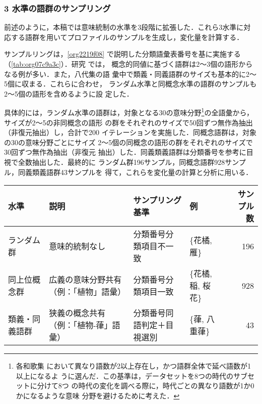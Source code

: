 \documentclass[submit]{ipsj}
\renewcommand{\ref}{\cref}
\begin{document}
\subsubsection{3 水準の語群のサンプリング\label{orgd9e4052}}
\label{sec:orgfc1bab2}
前述のように，本稿では意味統制の水準を3段階に拡張した．これら3水準に対
応する語群を用いてプロファイルのサンプルを生成し，変化量を計算する．

サンプルリングは，\ref{org2219f08} で説明した分類語彙表番号を基に実施する
（\ref{tab:org07c9a3c}）．研究 \cite{Speelman2003Profilebased} では，
概念的同値に基づく語群は2～3個の語形からなる例が多い．また，八代集の語
彙中で類義・同義語群のサイズも基本的に2～5個に収まる．これらに合わせ，
ランダム水準と同概念水準の語群のサンプルも2～5個の語形を含めるように設
定した．

具体的には，ランダム水準の語群は，対象となる30の意味分野\footnote{各和歌集
において異なり語数が2以上存在し，かつ語群全体で延べ語数が1以上になるよ
うに選んだ．この基準は，データセットを8つの時代のサブセットに分けて8つ
の時代の変化を調べる際に，時代ごとの異なり語数が1か0かになるような意味
分野を避けるために考えた．}の全語彙から，サイズが2～5の非同概念の語形
の群をそれぞれのサイズで50回ずつ無作為抽出（非復元抽出）し，合計で200
イテレーションを実施した．同概念語群は，対象の30の意味分野ごとにサイズ
2～5個の同概念の語形の群をそれぞれのサイズで30回ずつ無作為抽出（非復元
抽出）した．同義類義語群は分類番号を参考に目視で全数抽出した．最終的に
ランダム群196サンプル，同概念語群928サンプル，同義類義語群43サンプルを
得て，これらを変化量の計算と分析に用いる．

\begin{table*}[tb]
\caption{\label{tab:org07c9a3c}3水準の語形集合のサンプル例}
\centering
\begin{tabular}{llllr}
水準 & 説明 & サンプリング基準 & 例 & サンプル数\\
\hline
ランダム群 & 意味的統制なし & 分類番号分類項目不一致 & \{花橘, 雁\} & 196\\
同上位概念群 & 広義の意味分野共有（例：「植物」語彙） & 分類番号分類項目一致 & \{花橘, 稲, 桜花\} & 928\\
類義・同義語群 & 狭義の概念共有（例：「植物-葎」語彙） & 分類番号同語判定＋目視選別 & \{葎, 八重葎\} & 43\\
\end{tabular}
\end{table*}
\end{document}
